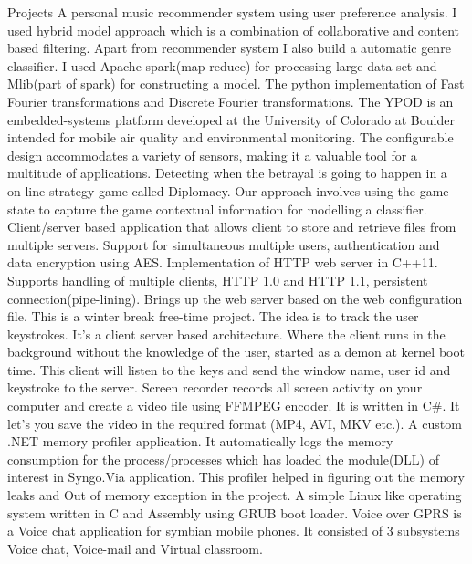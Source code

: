 \begin{category}{Projects}
 A personal music recommender system using user preference analysis. I used hybrid model approach which is a combination of collaborative and content based filtering. Apart from recommender system I also build a automatic genre classifier. I used Apache spark(map-reduce) for processing large data-set and Mlib(part of spark) for constructing a model.
 The python implementation of Fast Fourier transformations and Discrete Fourier transformations.
 The YPOD is an embedded-systems platform developed at the University of Colorado at Boulder intended for mobile air quality and environmental monitoring. The configurable design accommodates a variety of sensors, making it a valuable tool for a multitude of applications.
 Detecting when the betrayal is going to happen in a on-line strategy game called Diplomacy. Our approach involves using the game state to capture the game contextual information for modelling a classifier.
 Client/server based application that allows client to store and retrieve files from multiple servers. Support for simultaneous multiple users, authentication and data encryption using AES.
 Implementation of HTTP web server in C++11. Supports handling of multiple clients, HTTP 1.0 and HTTP 1.1, persistent connection(pipe-lining). Brings up the web server based on the web configuration file.
 This is a winter break free-time project. The idea is to track the user keystrokes. It's a client server based architecture. Where the client runs in the background without the knowledge of the user, started as a demon at kernel boot time. This client will listen to the keys and send the window name, user id and keystroke to the server.
 Screen recorder records all screen activity on your computer and create a video file using FFMPEG encoder. It is written in C\#. It let's you save the video in the required format (MP4, AVI, MKV etc.).
 A custom .NET memory profiler application. It automatically logs the memory consumption for the process/processes which has loaded the module(DLL) of interest in Syngo.Via application. This profiler helped in figuring out the memory leaks and Out of memory exception in the project.
 A simple Linux like operating system written in C and Assembly using GRUB boot loader.
 Voice over GPRS is a Voice chat application for symbian mobile phones. It consisted of 3 subsystems Voice chat, Voice-mail and Virtual classroom.
\end{category}
